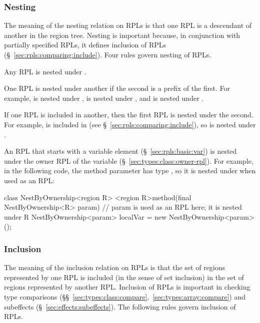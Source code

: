 \subsubsection{Nesting%
\label{sec:rpls:comparing:nest}}

The meaning of the nesting relation on RPLs is that one RPL is a
descendant of another in the region tree.  Nesting is important
because, in conjunction with partially specified RPLs, it defines
inclusion of RPLs (\S~\ref{sec:rpls:comparing:include}).  Four rules
govern nesting of RPLs.

  Any RPL is nested under
.

 One RPL is nested under another if the
second is a prefix of the first.  For example,  is nested
under ,  is nested under , and 
is nested under .

 If one RPL is included in another, then
the first RPL is nested under the second.  For example,  is
included in  (see \S~\ref{sec:rpls:comparing:include}), so
 is nested under .

 An RPL that starts with a variable
element (\S~\ref{sec:rpls:basic:var}) is nested under the owner RPL of
the variable (\S~\ref{sec:types:class:owner-rpl}).  For example, in
the following code, the method parameter  has type
, so it is nested under  when used as
an RPL:
%
\begin{dpjlisting}
class NestByOwnership<region R> {
  <region R>method(final NestByOwnership<R> param) {
    // param is used as an RPL here; it is nested under R
    NestByOwnership<param> localVar = new NestByOwnership<param>();
  }
}
\end{dpjlisting}

\subsubsection{Inclusion%
\label{sec:rpls:comparing:include}}

The meaning of the inclusion relation on RPLs is that the set of
regions represented by one RPL is included (in the sense of set
inclusion) in the set of regions represented by another RPL.
Inclusion of RPLs is important in checking type comparisons
(\S\S~\ref{sec:types:class:compare},~\ref{sec:types:array:compare})
and subeffects (\S~\ref{sec:effects:subeffects}).  The following rules
govern inclusion of RPLs.

